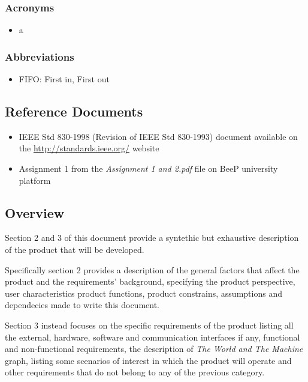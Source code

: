 		\subsubsection{Acronyms}
		\begin{itemize}
			\item a
		\end{itemize}
		\subsubsection{Abbreviations}
		\begin{itemize}
			\item FIFO: First in, First out
		\end{itemize}
	\subsection{Reference Documents}
	\begin{itemize}
		\item IEEE Std 830-1998 (Revision of IEEE Std 830-1993) document available on the \url{http://standards.ieee.org/} website
		\item Assignment 1 from the \emph{Assignment 1 and 2.pdf} file on BeeP university platform
	\end{itemize}
	\subsection{Overview}
		Section 2 and 3 of this document provide a syntethic but exhaustive description of the product that will be developed.
				
		Specifically section 2 provides a description of the general factors that affect the product and the requirements' background, specifying the product perspective, user characteristics product functions, product constrains, assumptions and dependecies made to write this document.
		
		Section 3 instead focuses on the specific requirements of the product listing all the external, hardware, software and communication interfaces if any, functional and non-functional requirements, the description of \emph{The World and The Machine} graph, listing some scenarios of interest in which the product will operate and other requirements that do not belong to any of the previous category. 
	
	